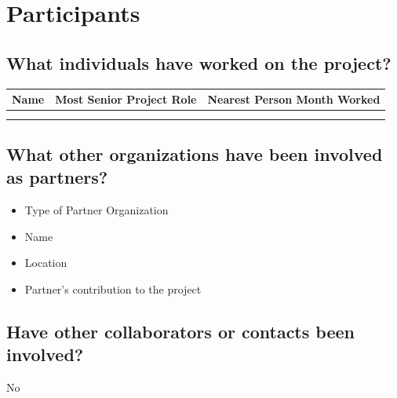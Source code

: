\documentclass{article}
\begin{document}
\section*{Participants}


\subsection*{What individuals have worked on the project?}
\begin{tabular}{c@{\hskip 1.5in} c@{\hskip 0.25in} c} 
Name & Most Senior Project Role & Nearest Person Month Worked 
\\\hline
\\\hline
\\\hline
\end{tabular}
\vspace{5mm}
\subsection*{What other organizations have been involved as partners?}

\begin{itemize}
\setlength{\itemsep}{5pt}
 \setlength{\parskip}{5pt}
 \setlength{\parsep}{5pt}
    \item Type of Partner Organization
    \item Name
    \item Location
    \item Partner’s contribution to the project
\end{itemize}
\vspace{5mm}
\subsection*{Have other collaborators or contacts been involved?} 
 \hspace{1in} No
\newpage
\end{document}
